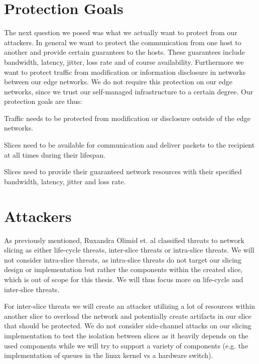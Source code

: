 \section{Protection Goals}
\label{protection_goals}
The next question we posed was what we actually want to protect from our attackers. In general we want to protect the communication from one host to another and provide certain guarantees to the hosts. These guarantees include bandwidth, latency, jitter, loss rate and of course availability. Furthermore we want to protect traffic from modification or information disclosure in networks between our edge networks. We do not require this protection on our edge networks, since we trust our self-managed infrastructure to a certain degree. Our protection goals are thus:
\begin{description}[style=multiline, labelwidth=0.7cm]
    \item[\namedlabel{P1}{P1}] Traffic needs to be protected from modification or disclosure outside of the edge networks.
    \item[\namedlabel{P2}{P2}] Slices need to be available for communication and deliver packets to the recipient at all times during their lifespan.
    \item[\namedlabel{P3}{P3}] Slices need to provide their guaranteed network resources with their specified bandwidth, latency, jitter and loss rate.
\end{description}

\section{Attackers}
\label{adversaries}
As previously mentioned, Ruxandra Olimid et. al \cite{SE2} classified threats to network slicing as either life-cycle threats, inter-slice threats or intra-slice threats. We will not consider intra-slice threats, as intra-slice threats do not target our slicing design or implementation but rather the components within the created slice, which is out of scope for this thesis. We will thus focus more on life-cycle and inter-slice threats.

For inter-slice threats we will create an attacker utilizing a lot of resources within another slice to overload the network and potentially create artifacts in our slice that should be protected. We do not consider side-channel attacks on our slicing implementation to test the isolation between slices as it heavily depends on the used components while we will try to support a variety of components (e.g. the implementation of queues in the linux kernel vs a hardware switch).

